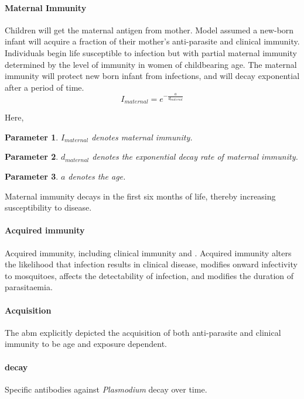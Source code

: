 \documentclass[a4paper, 12pt, twoside]{article}
\newtheorem{parameter}{Parameter}
\begin{document}
\paragraph{Maternal Immunity}%
\label{par:maternal_immunity}
Children will get the maternal antigen from mother.
Model assumed a new-born infant will acquire a fraction of their mother’s anti-parasite and clinical immunity.
Individuals begin life susceptible to infection but with partial maternal immunity determined by the level of immunity in women of childbearing age.
The maternal immunity will protect new born infant from infections, and will decay exponential after a period of time.
\begin{equation}
	I_{maternal} = e^{- \frac{a}{d_{maternal}}}
\end{equation}

Here,

\begin{parameter}
	{$I_{maternal}$}
	{denotes maternal immunity.}
\end{parameter}
\begin{parameter}
	{$d_{maternal}$}
	{denotes the exponential decay rate of maternal immunity.}
\end{parameter}
\begin{parameter}
	{$a$}
	{denotes the age.}
\end{parameter}

Maternal immunity decays in the first six months of life, thereby increasing susceptibility to disease.

\paragraph{Acquired immunity}%
\label{par:acquired_immunity}
Acquired immunity, including clinical immunity and .
Acquired immunity alters the likelihood that infection results in clinical disease, modifies onward infectivity to mosquitoes, affects the detectability of infection, and modifies the duration of parasitaemia.

\paragraph{Acquisition}%
\label{par:acquisition}
The \gls{abm} explicitly depicted the acquisition of both anti-parasite and clinical immunity to be age and exposure dependent.

\paragraph{decay}%
\label{par:decay}
Specific antibodies against \textit{Plasmodium} decay over time.
\end{document}
